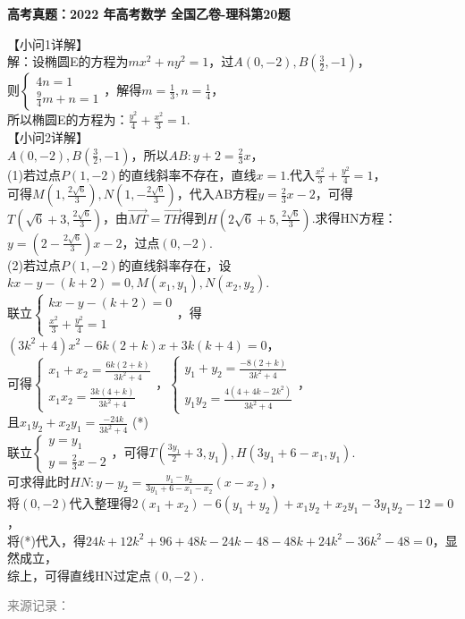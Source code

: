 \documentclass[UTF8,a4paper,11pt]{ctexart}
\newenvironment{gaokao}[1]{\par\medskip\noindent\textbf{高考真题：#1}\par\smallskip}{\par\medskip}
\begin{document}
\begin{gaokao}{2022 年高考数学 全国乙卷-理科第20题}
【小问1详解】\\解：设椭圆E的方程为$mx^2+ny^2=1$，过$A(0,-2), B\left(\frac{3}{2},-1\right)$，\\则$\begin{cases} 4n=1 \\ \frac{9}{4}m+n=1 \end{cases}$，解得$m=\frac{1}{3}, n=\frac{1}{4}$，\\所以椭圆E的方程为：$\frac{y^2}{4}+\frac{x^2}{3}=1$.\\【小问2详解】\\$A(0,-2), B(\frac{3}{2},-1)$，所以$AB: y+2 = \frac{2}{3}x$，\\(1)若过点$P(1,-2)$的直线斜率不存在，直线$x=1$.代入$\frac{x^2}{3}+\frac{y^2}{4}=1$，\\可得$M\left(1,\frac{2\sqrt{6}}{3}\right), N\left(1,-\frac{2\sqrt{6}}{3}\right)$，代入AB方程$y=\frac{2}{3}x-2$，可得\\$T\left(\sqrt{6}+3,\frac{2\sqrt{6}}{3}\right)$，由$\overrightarrow{MT}=\overrightarrow{TH}$得到$H\left(2\sqrt{6}+5,\frac{2\sqrt{6}}{3}\right)$.求得HN方程：$y=\left(2-\frac{2\sqrt{6}}{3}\right)x-2$，过点$(0,-2)$.\\(2)若过点$P(1,-2)$的直线斜率存在，设$kx-y-(k+2)=0, M(x_1,y_1), N(x_2,y_2)$.\\联立$\begin{cases} kx-y-(k+2)=0 \\ \frac{x^2}{3}+\frac{y^2}{4}=1 \end{cases}$，得$(3k^2+4)x^2 - 6k(2+k)x + 3k(k+4)=0$，\\可得$\begin{cases} x_1+x_2 = \frac{6k(2+k)}{3k^2+4} \\ x_1x_2 = \frac{3k(4+k)}{3k^2+4} \end{cases}$，$\begin{cases} y_1+y_2 = \frac{-8(2+k)}{3k^2+4} \\ y_1y_2 = \frac{4(4+4k-2k^2)}{3k^2+4} \end{cases}$，\\且$x_1y_2+x_2y_1 = \frac{-24k}{3k^2+4}$ (*)\\联立$\begin{cases} y=y_1 \\ y=\frac{2}{3}x-2 \end{cases}$，可得$T\left(\frac{3y_1}{2}+3, y_1\right), H(3y_1+6-x_1, y_1)$.\\可求得此时$HN: y-y_2 = \frac{y_1-y_2}{3y_1+6-x_1-x_2}(x-x_2)$，\\将$(0,-2)$代入整理得$2(x_1+x_2)-6(y_1+y_2)+x_1y_2+x_2y_1-3y_1y_2-12=0$，\\将(*)代入，得$24k+12k^2+96+48k-24k-48-48k+24k^2-36k^2-48=0$，显然成立，\\综上，可得直线HN过定点$(0,-2)$.

\par\smallskip\textcolor{gray}{\footnotesize 来源记录：\texttt{}}

\end{gaokao}

\clearpage
\end{document}
